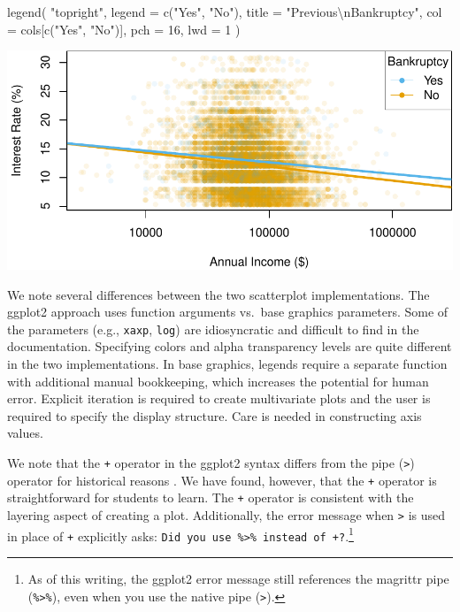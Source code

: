 \documentclass[12pt]{article}
\newenvironment{Shaded}{\begin{snugshade}}{\end{snugshade}}
\newcommand{\AttributeTok}[1]{\textcolor[rgb]{0.77,0.63,0.00}{#1}}
\newcommand{\DecValTok}[1]{\textcolor[rgb]{0.00,0.00,0.81}{#1}}
\newcommand{\FunctionTok}[1]{\textcolor[rgb]{0.00,0.00,0.00}{#1}}
\newcommand{\NormalTok}[1]{#1}
\newcommand{\SpecialCharTok}[1]{\textcolor[rgb]{0.00,0.00,0.00}{#1}}
\newcommand{\StringTok}[1]{\textcolor[rgb]{0.31,0.60,0.02}{#1}}
\begin{document}
\begin{Shaded}
\begin{Highlighting}[]
\FunctionTok{legend}\NormalTok{(}
  \StringTok{"topright"}\NormalTok{, }
  \AttributeTok{legend =} \FunctionTok{c}\NormalTok{(}\StringTok{"Yes"}\NormalTok{, }\StringTok{"No"}\NormalTok{), }
  \AttributeTok{title =} \StringTok{"Previous}\SpecialCharTok{\textbackslash{}n}\StringTok{Bankruptcy"}\NormalTok{, }
  \AttributeTok{col =}\NormalTok{ cols[}\FunctionTok{c}\NormalTok{(}\StringTok{"Yes"}\NormalTok{, }\StringTok{"No"}\NormalTok{)], }
  \AttributeTok{pch =} \DecValTok{16}\NormalTok{, }\AttributeTok{lwd =} \DecValTok{1}
\NormalTok{)}
\end{Highlighting}
\end{Shaded}

\begin{center}\includegraphics[width=0.8\linewidth]{educators-perspective-tidyverse_files/figure-latex/base-scat-1} \end{center}

\label{base-scat} \linespread{2}
\vspace{3mm}\setlength{\parindent}{15pt}

We note several differences between the two scatterplot implementations.
The ggplot2 approach uses function arguments vs.~base graphics
parameters. Some of the parameters (e.g., \texttt{xaxp}, \texttt{log})
are idiosyncratic and difficult to find in the documentation. Specifying
colors and alpha transparency levels are quite different in the two
implementations. In base graphics, legends require a separate function
with additional manual bookkeeping, which increases the potential for
human error. Explicit iteration is required to create multivariate plots
and the user is required to specify the display structure. Care is
needed in constructing axis values.

We note that the \texttt{+} operator in the ggplot2 syntax differs from
the pipe (\texttt{\textbar{}\textgreater{}}) operator for historical
reasons \citep{wickham2015pipe}. We have found, however, that the
\texttt{+} operator is straightforward for students to learn. The
\texttt{+} operator is consistent with the layering aspect of creating a
plot. Additionally, the error message when
\texttt{\textbar{}\textgreater{}} is used in place of \texttt{+}
explicitly asks:
\texttt{Did\ you\ use\ \%\textgreater{}\%\ instead\ of\ +?}.\footnote{As
  of this writing, the ggplot2 error message still references the
  magrittr pipe (\texttt{\%\textgreater{}\%}), even when you use the
  native pipe (\texttt{\textbar{}\textgreater{}}).}
\end{document}
